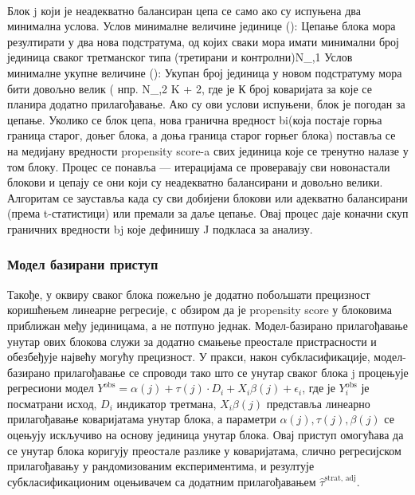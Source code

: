 \documentclass[12pt, a4paper]{article}
\begin{document}
\\Блок j који је неадекватно балансиран цепа се само ако су испуњена два минимална услова.  
Услов минималне величине јединице (): Цепање блока мора резултирати у два нова подстратума, од којих сваки мора имати минимални број јединица сваког третманског типа (третирани и контролни)N_{\min,1}  \quad {}
Услов минималне укупне величине (): Укупан број јединица у новом подстратуму мора бити довољно велик ( нпр. N_{\min,2} \ge K + 2, где је К број коваријата за које се планира додатно прилагођавање. Ако су ови услови испуњени, блок је погодан за цепање.
Уколико се блок цепа, нова гранична вредност bi(која постаје горња граница старог, доњег блока, а доња граница старог горњег блока) поставља се на медијану вредности propensity score-a свих јединица које се тренутно налазе у том блоку.
Процес се понавља — итерацијама се проверавају сви новонастали блокови и цепају се они који су неадекватно балансирани и довољно велики. Алгоритам се зауставља када су сви добијени блокови или адекватно балансирани (према t-статистици) или премали за даље цепање. Овај процес даје коначни скуп граничних вредности bj које дефинишу J подкласа за анализу.

\subsubsection{Модел базирани приступ}

Такође, у оквиру сваког блока пожељно је додатно побољшати прецизност коришћењем линеарне регресије, с обзиром да је propensity score у блоковима приближан међу јединицама, а не потпуно једнак. 
Модел-базирано прилагођавање унутар ових блокова служи за додатно смањење преостале пристрасности и обезбеђује највећу могућу прецизност.  У пракси, након субкласификације, модел-базирано прилагођавање се спроводи тако што се унутар сваког блока j процењује регресиони модел $Y^{\text{obs}} = \alpha(j) + \tau(j) \cdot D_i + X_i \beta(j) + \epsilon_i$,  где је $Y_i^{\text{obs}}$ је посматрани исход, $D_i$ индикатор третмана, $X_i\beta(j)$ представља линеарно прилагођавање коваријатама унутар блока, а параметри $\alpha(j), \tau(j), \beta(j)$ се оцењују искључиво на основу јединица унутар блока.
Овај приступ омогућава да се унутар блока коригују преостале разлике у коваријатама, слично регресијском прилагођавању у рандомизованим експериментима, и резултује субкласификационим оцењивачем са додатним прилагођавањем $\hat{\tau}^{\text{strat, adj}}$.
\end{document}
